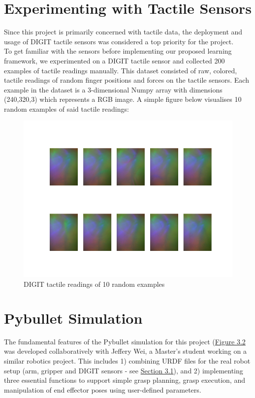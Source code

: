 \documentclass[12pt, a4paper]{report}
\theoremstyle{definition}
\begin{document}
\section{Experimenting with Tactile Sensors}
\label{sec:3.2}
Since this project is primarily concerned with tactile data, the deployment and usage of DIGIT \cite{digit} tactile sensors was considered a top priority for the project.\\

To get familiar with the sensors before implementing our proposed learning framework, we experimented on a DIGIT tactile sensor and collected 200 examples of tactile readings manually. This dataset consisted of raw, colored, tactile readings of random finger positions and forces on the tactile sensors. Each example in the dataset is a 3-dimensional Numpy array with dimensions (240,320,3) which represents a RGB image. A simple figure below visualises 10 random examples of said tactile readings:
\begin{figure}[H]
    \centering
    \includegraphics[scale=0.4]{docs/Project Report/Media/tacto_testing.png}
    \caption{DIGIT tactile readings of 10 random examples}
    \label{fig:digit\_readings}
\end{figure}


\section{Pybullet Simulation}
\label{sec:3.3}
The fundamental features of the Pybullet simulation for this project (\hyperref[fig:pbSimScreenshot]{Figure 3.2} was developed collaboratively with Jeffery Wei, a Master's student working on a similar robotics project. This includes 1) combining URDF files for the real robot setup (arm, gripper and DIGIT sensors - see \hyperref[sec:3.1]{Section 3.1}), and 2) implementing three essential functions to support simple grasp planning, grasp execution, and manipulation of end effector poses using user-defined parameters.
\end{document}

